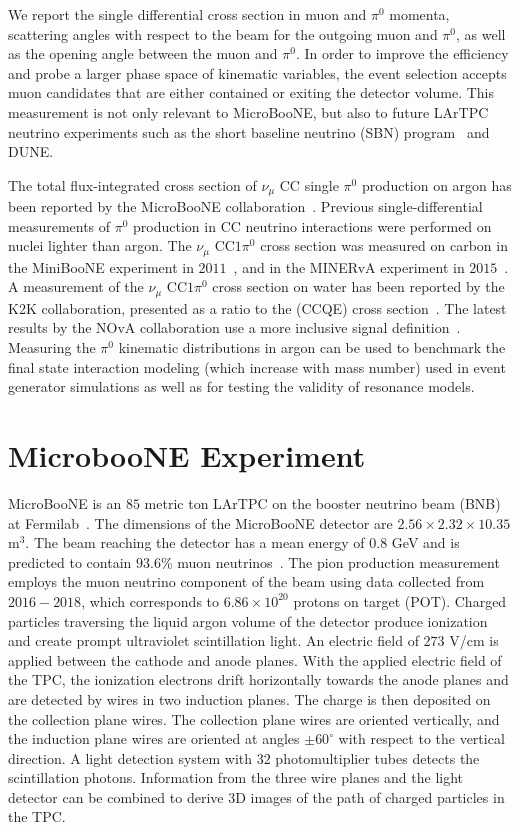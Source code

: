 \documentclass[%
 reprint,
 amsmath,amssymb, longbibliography,
 aps, 
 prd,
 twocolumn,
 showpacs,
 superscriptaddress
]{revtex4-2}
\begin{document}
We report the single differential cross section in muon and $\pi^0$ momenta, scattering angles with respect to the beam for the outgoing muon and $\pi^0$, as well as the opening angle between the muon and $\pi^0$. In order to improve the efficiency and probe a larger phase space of kinematic variables, the event selection accepts muon candidates that are either contained or exiting the detector volume. This measurement is not only relevant to MicroBooNE, but also to future LArTPC neutrino experiments such as the short baseline neutrino (SBN) program~\cite{doi:10.1146/annurev-nucl-101917-020949} and DUNE. 

The total flux-integrated cross section of $\nu_{\mu}$ CC single $\pi^0$ production on argon has been reported by the MicroBooNE collaboration~\cite{PhysRevD.99.091102}. Previous single-differential measurements of $\pi^0$ production in CC neutrino interactions were performed on nuclei lighter than argon. The $\nu_{\mu}$ $\textrm{CC}1\pi^0$ cross section was measured on carbon in the MiniBooNE experiment in $2011$~\cite{PhysRevD.83.052009}, and in the MINERvA experiment in $2015$~\cite{LE2015130, PhysRevD.96.072003}. A measurement of the $\nu_{\mu}$ $\textrm{CC}1\pi^0$ cross section on water has been reported by the K2K collaboration, presented as a ratio to the (CCQE) cross section~\cite{PhysRevD.83.054023}. The latest results by the NOvA collaboration use a more inclusive signal definition~\cite{NOVA_LATEST_PRD}. 
Measuring the $\pi^0$ kinematic distributions in argon can be used to benchmark the final state interaction modeling (which increase with mass number) used in event generator simulations as well as for testing the validity of resonance models.
\section{MicrobooNE Experiment}
MicroBooNE is an $85$ metric ton LArTPC on the booster neutrino beam (BNB) at Fermilab~\cite{Acciarri_2017}.  The dimensions of the MicroBooNE detector are $2.56 \times 2.32 \times 10.35$ m$^3$. The beam reaching the detector has a mean energy of $0.8$ GeV and is predicted to contain $93.6$\% muon neutrinos~\cite{osti_1212167}. The pion production measurement employs the muon neutrino component of the beam using data collected from $2016-2018$, which corresponds to $6.86\times10^{20}$ protons on target (POT). Charged particles traversing the liquid argon volume of the detector produce ionization and create prompt ultraviolet scintillation light. An electric field of $273$ V/cm is applied between the cathode and anode planes. With the applied electric field of the TPC, the ionization electrons drift horizontally towards the anode planes and are detected by wires in two induction planes. The charge is then deposited on the collection plane wires. The collection plane wires are oriented vertically, and the induction plane wires are oriented at angles $\pm 60^{\circ}$ with respect to the vertical direction. A light detection system with $32$ photomultiplier tubes detects the scintillation photons. Information from the three wire planes and the light detector can be combined to derive 3D images of the path of charged particles in the TPC. 
\end{document}
